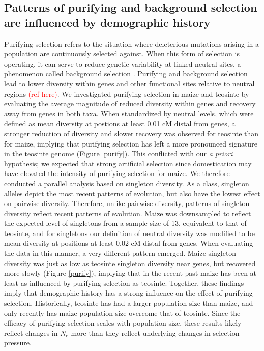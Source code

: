 \documentclass{pnastwo}
\begin{document}
\begin{article}
\subsection{Patterns of purifying and background selection are
  influenced by demographic history}
Purifying selection refers to the situation where deleterious
mutations arising in a population are continuously selected against. When this
form of selection is operating, it can serve to reduce genetic
variability at linked neutral sites, a phenomenon called
background selection \cite{charlesworth1993}. Purifying and background selection lead
to lower diversity within genes and other functional sites relative
to neutral regions \textcolor{red}{(ref here)}. We investigated purifying
selection in maize and teosinte by evaluating the average magnitude of reduced
diversity within genes and recovery away from genes in both taxa. When standardized by neutral
levels, which were defined as mean diversity at postions at least 0.01 cM distal
from genes, a stronger reduction of diversity
and slower recovery was observed for teosinte than for maize, implying
that purifying selection has left a more pronounced signature in the
teosinte genome (Figure \ref{purify}). This conflicted with our \emph{a priori} hypothesis;
we expected that strong artificial selection since domestication may
have elevated the intensity of purifying selection for maize. We therefore
conducted a parallel analysis based on singleton diversity. As a class,
singleton alleles depict the most recent patterns of evolution, but
also have the lowest effect on pairwise diversity. Therefore, unlike
pairwise diversity, patterns of singleton
diversity reflect recent patterns of evolution. Maize was downsampled
to reflect the expected level of singletons from a sample size of 13,
equivalent to that of teosinte, and for singletons our definition of
neutral diversity was modified to be mean diversity at positions at
least 0.02 cM distal from genes. When
evaluating the data in this manner, a very different pattern
emerged. Maize singleton diversity was just as low as teosinte singleton
diversity near genes, but recovered more slowly
(Figure \ref{purify}), implying that in the
recent past maize has been at least as influenced by purifying selection as
teosinte. Together, these findings imply that demographic history has
a strong influence on the effect of purifying selection. Historically,
teosinte has had a larger population size than maize, and only
recently has maize population size overcome that of teosinte. Since
the efficacy of purifying selection scales with population size,
these results likely reflect changes in $N_e$ more than they reflect
underlying changes in selection pressure.



\end{article}
\end{document}
